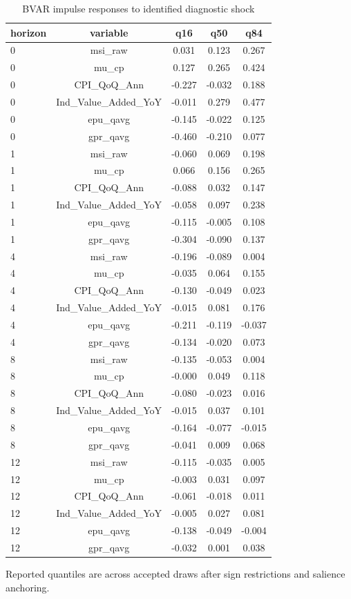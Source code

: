 \begin{table}[!htbp]
\centering
\caption{BVAR impulse responses to identified diagnostic shock}
\label{tab:bvar_irf_summary}
\begin{threeparttable}
\begin{tabular}{lcccc}
\toprule
horizon & variable & q16 & q50 & q84 \\
\midrule
0 & msi\_raw & 0.031 & 0.123 & 0.267 \\
0 & mu\_cp & 0.127 & 0.265 & 0.424 \\
0 & CPI\_QoQ\_Ann & -0.227 & -0.032 & 0.188 \\
0 & Ind\_Value\_Added\_YoY & -0.011 & 0.279 & 0.477 \\
0 & epu\_qavg & -0.145 & -0.022 & 0.125 \\
0 & gpr\_qavg & -0.460 & -0.210 & 0.077 \\
1 & msi\_raw & -0.060 & 0.069 & 0.198 \\
1 & mu\_cp & 0.066 & 0.156 & 0.265 \\
1 & CPI\_QoQ\_Ann & -0.088 & 0.032 & 0.147 \\
1 & Ind\_Value\_Added\_YoY & -0.058 & 0.097 & 0.238 \\
1 & epu\_qavg & -0.115 & -0.005 & 0.108 \\
1 & gpr\_qavg & -0.304 & -0.090 & 0.137 \\
4 & msi\_raw & -0.196 & -0.089 & 0.004 \\
4 & mu\_cp & -0.035 & 0.064 & 0.155 \\
4 & CPI\_QoQ\_Ann & -0.130 & -0.049 & 0.023 \\
4 & Ind\_Value\_Added\_YoY & -0.015 & 0.081 & 0.176 \\
4 & epu\_qavg & -0.211 & -0.119 & -0.037 \\
4 & gpr\_qavg & -0.134 & -0.020 & 0.073 \\
8 & msi\_raw & -0.135 & -0.053 & 0.004 \\
8 & mu\_cp & -0.000 & 0.049 & 0.118 \\
8 & CPI\_QoQ\_Ann & -0.080 & -0.023 & 0.016 \\
8 & Ind\_Value\_Added\_YoY & -0.015 & 0.037 & 0.101 \\
8 & epu\_qavg & -0.164 & -0.077 & -0.015 \\
8 & gpr\_qavg & -0.041 & 0.009 & 0.068 \\
12 & msi\_raw & -0.115 & -0.035 & 0.005 \\
12 & mu\_cp & -0.003 & 0.031 & 0.097 \\
12 & CPI\_QoQ\_Ann & -0.061 & -0.018 & 0.011 \\
12 & Ind\_Value\_Added\_YoY & -0.005 & 0.027 & 0.081 \\
12 & epu\_qavg & -0.138 & -0.049 & -0.004 \\
12 & gpr\_qavg & -0.032 & 0.001 & 0.038 \\
\bottomrule
\end{tabular}
\begin{tablenotes}[flushleft]
\footnotesize
\item Reported quantiles are across accepted draws after sign restrictions and salience anchoring.
\end{tablenotes}
\end{threeparttable}
\end{table}
